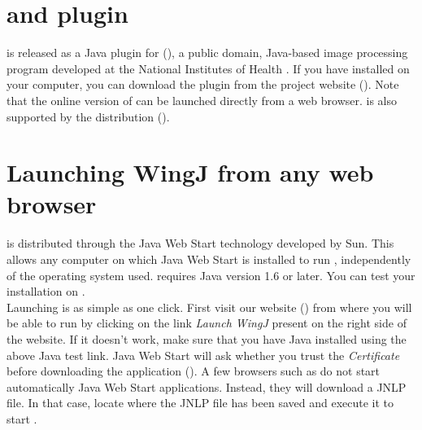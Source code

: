 \section{\ij and \fiji plugin}
\wingj is released as a Java plugin for \ij (\ijWebsite), a public domain, Java-based image processing program developed at the National Institutes of Health \autocite{schneider2012nih}. If you have \ij installed on your computer, you can download the \wingj \ij plugin from the project website (\wingjShortUrl). Note that the online version of \wingj can be launched directly from a web browser. \wingj is also supported by the \ij distribution \fiji (\fijiWebsite).

\section{Launching WingJ from any web browser}\label{sec:launch_wingj}
\wingj is distributed through the Java Web Start technology developed by Sun. This allows any computer on which Java Web Start is installed to run \wingj, independently of the operating system used. \wingj requires Java version 1.6 or later. You can test your installation on \testJavaWebsite.\\

Launching \wingj is as simple as one click. First visit our website (\wingjShortUrl) from where you will be able to run \wingj by clicking on the link \emph{Launch WingJ} present on the right side of the website. If it doesn't work, make sure that you have Java installed using the above Java test link. Java Web Start will ask whether you trust the \textit{Certificate} before downloading the application (). A few browsers such as \chrome do not start automatically Java Web Start applications. Instead, they will download a JNLP file. In that case, locate where the JNLP file has been saved and execute it to start \wingj.\\

